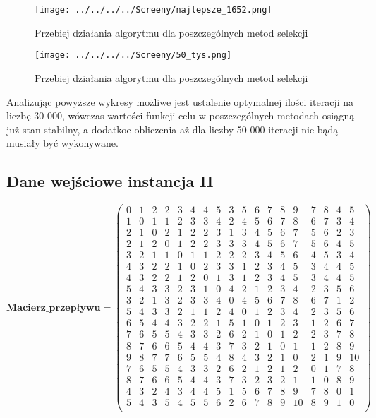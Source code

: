 \begin{figure}[h!]
		\texttt{[image: ../../../../Screeny/najlepsze\_1652.png]}
		\caption{Przebiej działania algorytmu dla poszczególnych metod selekcji}
		\label{ranking2pic}			
\end{figure}

\begin{figure}[h!]
		\texttt{[image: ../../../../Screeny/50\_tys.png]}
		\caption{Przebiej działania algorytmu dla poszczególnych metod selekcji}
		\label{ranking2picun}			
\end{figure}

Analizując powyższe wykresy możliwe jest ustalenie optymalnej ilości iteracji na liczbę 30 000, wówczas wartości funkcji celu w poszczególnych metodach osiągną już stan stabilny, a dodatkoe obliczenia aż dla liczby 50 000 iteracji nie bądą musiały być wykonywane.

\subsection{Dane wejściowe instancja II}

\par
$$
\mathbf{Macierz\_przepływu} =
\left( \begin{array}{cccccccccccccccccc}
0& 1& 2& 2& 3& 4& 4& 5& 3& 5& 6& 7& 8& 9& 7& 8& 4& 5\\
1& 0& 1& 1& 2& 3& 3& 4& 2& 4& 5& 6& 7& 8& 6& 7& 3& 4\\
2& 1& 0& 2& 1& 2& 2& 3& 1& 3& 4& 5& 6& 7& 5& 6& 2& 3\\
2& 1& 2& 0& 1& 2& 2& 3& 3& 3& 4& 5& 6& 7& 5& 6& 4& 5\\
3& 2& 1& 1& 0& 1& 1& 2& 2& 2& 3& 4& 5& 6& 4& 5& 3& 4\\
4& 3& 2& 2& 1& 0& 2& 3& 3& 1& 2& 3& 4& 5& 3& 4& 4& 5\\
4& 3& 2& 2& 1& 2& 0& 1& 3& 1& 2& 3& 4& 5& 3& 4& 4& 5\\
5& 4& 3& 3& 2& 3& 1& 0& 4& 2& 1& 2& 3& 4& 2& 3& 5& 6\\
3& 2& 1& 3& 2& 3& 3& 4& 0& 4& 5& 6& 7& 8& 6& 7& 1& 2\\
5& 4& 3& 3& 2& 1& 1& 2& 4& 0& 1& 2& 3& 4& 2& 3& 5& 6\\
6& 5& 4& 4& 3& 2& 2& 1& 5& 1& 0& 1& 2& 3& 1& 2& 6& 7\\
7& 6& 5& 5& 4& 3& 3& 2& 6& 2& 1& 0& 1& 2& 2& 3& 7& 8\\
8& 7& 6& 6& 5& 4& 4& 3& 7& 3& 2& 1& 0& 1& 1& 2& 8& 9\\
9& 8& 7& 7& 6& 5& 5& 4& 8& 4& 3& 2& 1& 0& 2& 1& 9& 10\\
7& 6& 5& 5& 4& 3& 3& 2& 6& 2& 1& 2& 1& 2& 0& 1& 7& 8\\
8& 7& 6& 6& 5& 4& 4& 3& 7& 3& 2& 3& 2& 1& 1& 0& 8& 9\\
4& 3& 2& 4& 3& 4& 4& 5& 1& 5& 6& 7& 8& 9& 7& 8& 0& 1\\
5& 4& 3& 5& 4& 5& 5& 6& 2& 6& 7& 8& 9& 10& 8& 9& 1& 0\\
\end{array} \right)
$$

